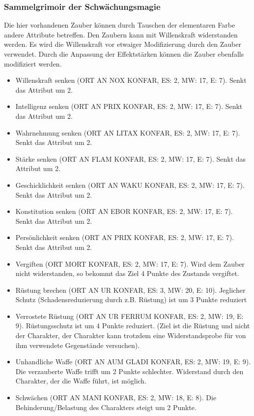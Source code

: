 \documentclass{article}
\begin{document}
\subsubsection{Sammelgrimoir der Schwächungsmagie}

Die hier vorhandenen Zauber können durch Tauschen der elementaren Farbe andere Attribute betreffen. Den Zaubern kann
mit Willenskraft widerstanden werden. Es wird die Willenskraft vor etwaiger Modifizierung durch den Zauber verwendet.
Durch die Anpassung der Effektstärken können die Zauber ebenfalls modifiziert werden.

\begin{itemize}
\item Willenskraft senken (ORT AN NOX KONFAR, ES: 2, MW: 17, E: 7). Senkt das Attribut um 2.
\item Intelligenz senken (ORT AN PRIX KONFAR, ES: 2, MW: 17, E: 7). Senkt das Attribut um 2.
\item Wahrnehmung senken (ORT AN LITAX KONFAR, ES: 2, MW: 17, E: 7). Senkt das Attribut um 2.
\item Stärke senken (ORT AN FLAM KONFAR, ES: 2, MW: 17, E: 7). Senkt das Attribut um 2.
\item Geschicklichkeit senken (ORT AN WAKU KONFAR, ES: 2, MW: 17, E: 7). Senkt das Attribut um 2.
\item Konstitution senken (ORT AN EBOR KONFAR, ES: 2, MW: 17, E: 7). Senkt das Attribut um 2.
\item Persönlichkeit senken (ORT AN PRIX KONFAR, ES: 2, MW: 17, E: 7). Senkt das Attribut um 2.
\item Vergiften (ORT MORT KONFAR, ES: 2, MW: 17, E: 7). Wird dem Zauber nicht widerstanden, so bekommt das Ziel 4 Punkte des Zustands vergiftet.
\item Rüstung brechen (ORT AN UR KONFAR, ES: 3, MW: 20, E: 10). Jeglicher Schutz (Schadensreduzierung durch z.B. Rüstung) ist um 3 Punkte reduziert
\item Verrostete Rüstung (ORT AN UR FERRUM KONFAR, ES: 2, MW: 19, E: 9). Rüstungsschutz ist um 4 Punkte reduziert. (Ziel ist die Rüstung und nicht der Charakter, der Charakter kann trotzdem eine Widerstandsprobe für von ihm verwendete Gegenstände versuchen).
\item Unhandliche Waffe (ORT AN AUM GLADI KONFAR, ES: 2, MW: 19, E: 9). Die verzauberte Waffe trifft um 2 Punkte schlechter. Widerstand durch den Charakter, der die Waffe führt, ist möglich.
\item Schwächen (ORT AN MANI KONFAR, ES: 2, MW: 18, E: 8). Die Behinderung/Belastung des Charakters steigt um 2 Punkte.
\end{itemize}
\end{document}
